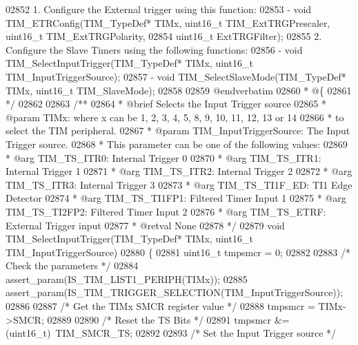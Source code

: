 \begin{DoxyCode}
02852 \textcolor{comment}{       1. Configure the External trigger using this function:}
02853 \textcolor{comment}{          - void TIM\_ETRConfig(TIM\_TypeDef* TIMx, uint16\_t TIM\_ExtTRGPrescaler, uint16\_t
       TIM\_ExtTRGPolarity,}
02854 \textcolor{comment}{                               uint16\_t ExtTRGFilter);}
02855 \textcolor{comment}{       2. Configure the Slave Timers using the following functions: }
02856 \textcolor{comment}{          - void TIM\_SelectInputTrigger(TIM\_TypeDef* TIMx, uint16\_t TIM\_InputTriggerSource);  }
02857 \textcolor{comment}{          - void TIM\_SelectSlaveMode(TIM\_TypeDef* TIMx, uint16\_t TIM\_SlaveMode); }
02858 \textcolor{comment}{}
02859 \textcolor{comment}{@endverbatim}
02860 \textcolor{comment}{  * @\{}
02861 \textcolor{comment}{  */}
02862 
02863 \textcolor{comment}{/**}
02864 \textcolor{comment}{  * @brief  Selects the Input Trigger source}
02865 \textcolor{comment}{  * @param  TIMx: where x can be  1, 2, 3, 4, 5, 8, 9, 10, 11, 12, 13 or 14  }
02866 \textcolor{comment}{  *         to select the TIM peripheral.}
02867 \textcolor{comment}{  * @param  TIM\_InputTriggerSource: The Input Trigger source.}
02868 \textcolor{comment}{  *          This parameter can be one of the following values:}
02869 \textcolor{comment}{  *            @arg TIM\_TS\_ITR0: Internal Trigger 0}
02870 \textcolor{comment}{  *            @arg TIM\_TS\_ITR1: Internal Trigger 1}
02871 \textcolor{comment}{  *            @arg TIM\_TS\_ITR2: Internal Trigger 2}
02872 \textcolor{comment}{  *            @arg TIM\_TS\_ITR3: Internal Trigger 3}
02873 \textcolor{comment}{  *            @arg TIM\_TS\_TI1F\_ED: TI1 Edge Detector}
02874 \textcolor{comment}{  *            @arg TIM\_TS\_TI1FP1: Filtered Timer Input 1}
02875 \textcolor{comment}{  *            @arg TIM\_TS\_TI2FP2: Filtered Timer Input 2}
02876 \textcolor{comment}{  *            @arg TIM\_TS\_ETRF: External Trigger input}
02877 \textcolor{comment}{  * @retval None}
02878 \textcolor{comment}{  */}
02879 \textcolor{keywordtype}{void} TIM_SelectInputTrigger(TIM\_TypeDef* TIMx, uint16\_t TIM\_InputTriggerSource)
02880 \{
02881   uint16\_t tmpsmcr = 0;
02882 
02883   \textcolor{comment}{/* Check the parameters */}
02884   assert_param(IS\_TIM\_LIST1\_PERIPH(TIMx));
02885   assert_param(IS\_TIM\_TRIGGER\_SELECTION(TIM\_InputTriggerSource));
02886 
02887   \textcolor{comment}{/* Get the TIMx SMCR register value */}
02888   tmpsmcr = TIMx->SMCR;
02889 
02890   \textcolor{comment}{/* Reset the TS Bits */}
02891   tmpsmcr &= (uint16\_t)~TIM_SMCR_TS;
02892 
02893   \textcolor{comment}{/* Set the Input Trigger source */}

\end{DoxyCode}
